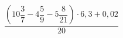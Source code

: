 \begin{ex}[type=calculate]
	\begin{condition}
		\( \dfrac{\left( 10\dfrac{3}{7}-4\dfrac{5}{9}-5\dfrac{8}{21} \right)\cdot6,3+0,02}{20} \)
	\end{condition}
\end{ex}